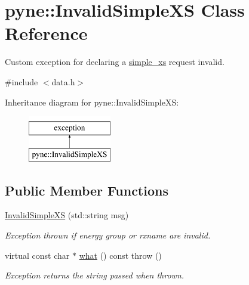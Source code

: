 \hypertarget{classpyne_1_1_invalid_simple_x_s}{\section{pyne\-:\-:Invalid\-Simple\-X\-S Class Reference}
\label{classpyne_1_1_invalid_simple_x_s}
}


Custom exception for declaring a \hyperlink{structsimple__xs}{simple\-\_\-xs} request invalid.  




{\ttfamily \#include $<$data.\-h$>$}

Inheritance diagram for pyne\-:\-:Invalid\-Simple\-X\-S\-:\begin{figure}[H]
\begin{center}
\leavevmode
\includegraphics[height=2.000000cm]{classpyne_1_1_invalid_simple_x_s}
\end{center}
\end{figure}
\subsection*{Public Member Functions}
\begin{DoxyCompactItemize}
\item 
\hypertarget{classpyne_1_1_invalid_simple_x_s_ad3bac5f587ea476c11a622024914d074}{\hyperlink{classpyne_1_1_invalid_simple_x_s_ad3bac5f587ea476c11a622024914d074}{Invalid\-Simple\-X\-S} (std\-::string msg)}\label{classpyne_1_1_invalid_simple_x_s_ad3bac5f587ea476c11a622024914d074}

\begin{DoxyCompactList}\small\item\em Exception thrown if energy group or rxname are invalid. \end{DoxyCompactList}\item 
\hypertarget{classpyne_1_1_invalid_simple_x_s_aaafdfd9422833d680a00d7c00263b04a}{virtual const char $\ast$ \hyperlink{classpyne_1_1_invalid_simple_x_s_aaafdfd9422833d680a00d7c00263b04a}{what} () const   throw ()}\label{classpyne_1_1_invalid_simple_x_s_aaafdfd9422833d680a00d7c00263b04a}

\begin{DoxyCompactList}\small\item\em Exception returns the string passed when thrown. \end{DoxyCompactList}\end{DoxyCompactItemize}


